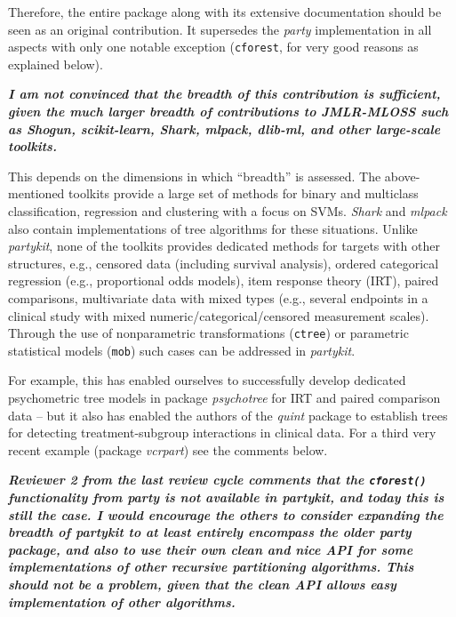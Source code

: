\documentclass{article}
\begin{document}
Therefore, the entire package along with its extensive documentation should be
seen as an original contribution. It supersedes the \emph{party} implementation
in all aspects with only one notable exception (\texttt{cforest}, for very good
reasons as explained below).

\smallskip

\textbf{\textit{%
I am not convinced that the breadth of this contribution is sufficient, given the much larger breadth of
contributions to JMLR-MLOSS such as Shogun, scikit-learn, Shark, mlpack, dlib-ml, and other large-scale toolkits.
}}

\smallskip

This depends on the dimensions in which ``breadth'' is assessed. The above-mentioned
toolkits provide a large set of methods for binary and multiclass classification, regression
and clustering with a focus on SVMs.  \emph{Shark} and \emph{mlpack} also
contain implementations of tree algorithms for these situations.  Unlike
\emph{partykit}, none of the toolkits provides dedicated methods for targets
with other structures, e.g., censored data (including survival analysis), ordered
categorical regression (e.g., proportional odds models), item response theory (IRT),
paired comparisons, multivariate data with mixed types (e.g., several endpoints in a clinical study
with mixed numeric/categorical/censored measurement scales). Through the use
of nonparametric transformations (\texttt{ctree}) or parametric statistical models (\texttt{mob})
such cases can be addressed in \emph{partykit}.

For example, this has enabled ourselves to successfully develop dedicated psychometric
tree models in package \emph{psychotree} for IRT and paired comparison data -- but it also
has enabled the authors of the \emph{quint} package to establish trees for detecting
treatment-subgroup interactions in clinical data. For a third very recent example
(package \emph{vcrpart}) see the comments below.


\smallskip

\textbf{\textit{%
Reviewer 2 from the last review cycle comments that the \texttt{cforest()}
functionality from party is not available in partykit, and today this is
still the case.  I would encourage the others to consider expanding the
breadth of partykit to at least entirely encompass the older party package,
and also to use their own clean and nice API for some implementations of
other recursive partitioning algorithms.  This should not be a problem,
given that the clean API allows easy implementation of other algorithms.
}}
\end{document}
